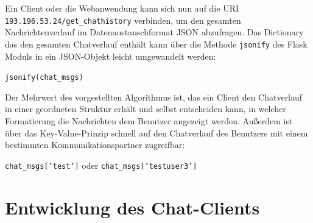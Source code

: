 \documentclass[a4paper,titlepage,halfparskip,12pt]{scrreprt}
\begin{document}
\begin{onehalfspacing}
Ein Client oder die Webanwendung kann sich nun auf die \acs{URI} \texttt{193.196.53.24/get\_chathistory} verbinden, um den gesamten Nachrichtenverlauf im Datenaustauschformat \acs{JSON} abzufragen. Das Dictionary das den gesamten Chatverlauf enthält kann über die Methode \texttt{jsonify} des Flask Moduls in ein JSON-Objekt leicht umgewandelt werden:

\texttt{jsonify(chat\_msgs)}

Der Mehrwert des vorgestellten Algorithmus ist, das ein Client den Chatverlauf in einer geordneten Struktur erhält und selbst entscheiden kann, in welcher Formatierung die Nachrichten dem Benutzer angezeigt werden. Außerdem ist über das Key-Value-Prinzip schnell auf den Chatverlauf des Benutzers mit einem bestimmten Kommunikationspartner zugreifbar:

\texttt{chat\_msgs['test']} oder \texttt{chat\_msgs['testuser3']}




\pagebreak

\section{Entwicklung des Chat-Clients}
\label{sec:ClientEntwicklung}


\end{onehalfspacing}
\end{document}
